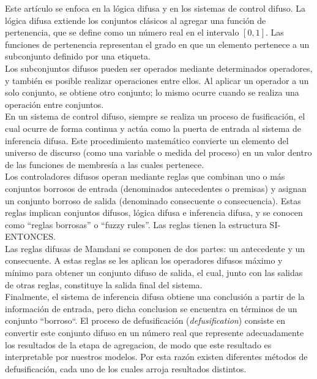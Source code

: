 \documentclass[sigconf, review=false, nonacm]{acmart}
\begin{document}
Este artículo se enfoca en la lógica difusa y en los sistemas de control difuso. La lógica difusa extiende los
conjuntos clásicos al agregar una función de pertenencia, que se define como un número real en el intervalo $
	[0, 1] $. Las funciones de pertenencia representan el grado en que un elemento pertenece a un subconjunto
definido por una etiqueta.\\

Los subconjuntos difusos pueden ser operados mediante determinados operadores, y también es posible realizar
operaciones entre ellos. Al aplicar un operador a un solo conjunto, se obtiene otro conjunto; lo mismo ocurre
cuando se realiza una operación entre conjuntos. \\

En un sistema de control difuso, siempre se realiza un proceso de fusificación, el cual ocurre de forma
continua y actúa como la puerta de entrada al sistema de inferencia difusa. Este procedimiento matemático
convierte un elemento del universo de discurso (como una variable o medida del proceso) en un valor dentro de
las funciones de membresía a las cuales pertenece.\\

Los controladores difusos operan mediante reglas que combinan uno o más conjuntos borrosos de entrada
(denominados antecedentes o premisas) y asignan un conjunto borroso de salida (denominado consecuente o
consecuencia). Estas reglas implican conjuntos difusos, lógica difusa e inferencia difusa, y se conocen como
``reglas borrosas'' o ``fuzzy rules''. Las reglas tienen la estructura SI-ENTONCES.\\

Las reglas difusas de Mamdani se componen de dos partes: un antecedente y un consecuente. A estas reglas se
les aplican los operadores difusos máximo y mínimo para obtener un conjunto difuso de salida, el cual, junto
con las salidas de otras reglas, constituye la salida final del sistema.\\

Finalmente, el sistema de inferencia difusa obtiene una conclusión a partir de la información de entrada, pero
dicha conclusion se encuentra en términos de un conjunto ``borroso``. El proceso de defusificación
(\textit{defusification}) consiste en convertir este conjunto difuso en un número real que represente
adecuadamente los resultados de la etapa de agregacion, de modo que este resultado es interpretable por
nuestros modelos. Por esta razón existen diferentes métodos de defusificación, cada uno de los cuales arroja
resultados distintos.
\end{document}
